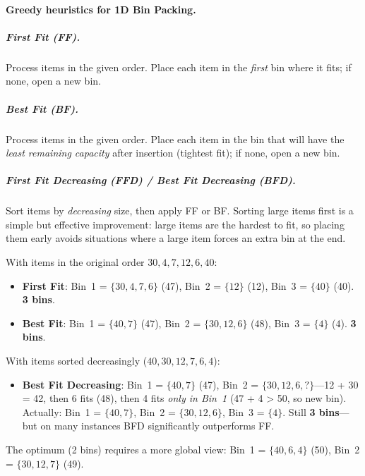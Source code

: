 \paragraph{Greedy heuristics for 1D Bin Packing.}

\subparagraph{First Fit (FF).}
Process items in the given order.  Place each item in the
\emph{first} bin where it fits; if none, open a new bin.

\subparagraph{Best Fit (BF).}
Process items in the given order.  Place each item in the bin
that will have the \emph{least remaining capacity} after
insertion (tightest fit); if none, open a new bin.

\subparagraph{First Fit Decreasing (FFD) / Best Fit Decreasing
  (BFD).}
Sort items by \emph{decreasing} size, then apply FF or BF\@.
Sorting large items first is a simple but effective improvement:
large items are the hardest to fit, so placing them early avoids
situations where a large item forces an extra bin at the end.

\begin{example}
\label{ex:bin-packing-greedy}
With items in the original order $30, 4, 7, 12, 6, 40$:
\begin{itemize}[nosep]
  \item \textbf{First Fit}: Bin~1 = $\{30, 4, 7, 6\}$ (47),
        Bin~2 = $\{12\}$ (12),
        Bin~3 = $\{40\}$ (40).
        \textbf{3 bins}.
  \item \textbf{Best Fit}: Bin~1 = $\{40, 7\}$ (47),
        Bin~2 = $\{30, 12, 6\}$ (48),
        Bin~3 = $\{4\}$ (4).
        \textbf{3 bins}.
\end{itemize}
With items sorted decreasingly ($40, 30, 12, 7, 6, 4$):
\begin{itemize}[nosep]
  \item \textbf{Best Fit Decreasing}: Bin~1 = $\{40, 7\}$ (47),
        Bin~2 = $\{30, 12, 6, \mathbf{?}\}$---12 + 30 = 42,
        then 6 fits (48), then 4 fits \emph{only in Bin~1}
        (47 + 4 > 50, so new bin).
        Actually: Bin~1 = $\{40, 7\}$, Bin~2 = $\{30, 12, 6\}$,
        Bin~3 = $\{4\}$.  Still \textbf{3 bins}---but on many
        instances BFD significantly outperforms FF\@.
\end{itemize}
The optimum (2 bins) requires a more global view:
Bin~1 = $\{40, 6, 4\}$ (50), Bin~2 = $\{30, 12, 7\}$ (49).
\end{example}

